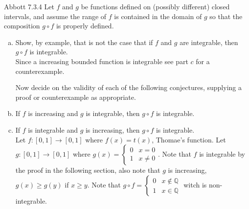 \documentclass[12pt]{article}
\makeatletter
\theoremstyle{homework}
\newenvironment{exercise}[1]
{\def\@currentlabel{#1}\exercisecore}
{\endexercisecore}
\makeatother
\begin{document}
\begin{exercise}
3
Abbott 7.3.4
\end{exercise}
Let $f$ and $g$ be functions defined on (possibly different) closed intervals, and assume the range of $f$ is contained in the domain of $g$ so that the composition $g \circ f$ is properly defined. 
\begin{enumerate}[(a)] 
\item Show, by example, that is not the case that if $f$ and $g$ are integrable, then $g \circ f$ is integrable.\\
Since a increasing bounded function is integrable see part $c$ for a counterexample.

Now decide on the validity of each of the following conjectures, supplying a proof or counterexample as appropriate.
\item If $f$ is increasing and $g$ is integrable, then $g \circ f$ is integrable. 
\item If $f$ is integrable and $g$ is increasing, then $g \circ f$ is integrable.\\
Let $f:[0,1]\rightarrow[0,1]$ where $f(x)=t(x)$, Thomae's function.  Let $g:[0,1]\rightarrow[0,1]$ where $g(x)=\begin{cases} 0 & x=0\\ 1 & x\neq 0 \end{cases}$.  Note that $f$ is integrable by the proof in the following section, also note that $g$ is increasing, $g(x)\geq g(y)$ if $x\geq y$.  Note that $g\circ f=\begin{cases} 0 & x\not\in\mathbb{Q}\\ 1 & x\in\mathbb{Q}\end{cases}$ witch is non-integrable.
\end{enumerate}
\end{document}
